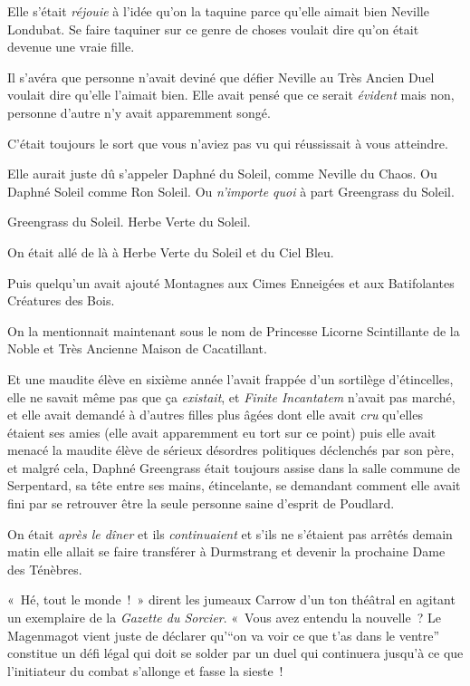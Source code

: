 Elle s'était \emph{réjouie} à l'idée qu'on la taquine parce qu'elle aimait bien Neville Londubat.
Se faire taquiner sur ce genre de choses voulait dire qu'on était devenue une vraie fille.

Il s'avéra que personne n'avait deviné que défier Neville au Très Ancien Duel voulait dire qu'elle l'aimait bien.
Elle avait pensé que ce serait \emph{évident} mais non, personne d'autre n'y avait apparemment songé.

C'était toujours le sort que vous n'aviez pas vu qui réussissait à vous atteindre.

Elle aurait juste dû s'appeler Daphné du Soleil, comme Neville du Chaos.
Ou Daphné Soleil comme Ron Soleil.
Ou \emph{n'importe quoi} à part Greengrass du Soleil.

Greengrass du Soleil.
Herbe Verte du Soleil.

On était allé de là à Herbe Verte du Soleil et du Ciel Bleu.

Puis quelqu'un avait ajouté Montagnes aux Cimes Enneigées et aux Batifolantes Créatures des Bois.

On la mentionnait maintenant sous le nom de Princesse Licorne Scintillante de la Noble et Très Ancienne Maison de Cacatillant.

Et une maudite élève en sixième année l'avait frappée d'un sortilège d'étincelles, elle ne savait même pas que ça \emph{existait}, et \emph{Finite Incantatem} n'avait pas marché, et elle avait demandé à d'autres filles plus âgées dont elle avait \emph{cru} qu'elles étaient ses amies (elle avait apparemment eu tort sur ce point) puis elle avait menacé la maudite élève de sérieux désordres politiques déclenchés par son père, et malgré cela, Daphné Greengrass était toujours assise dans la salle commune de Serpentard, sa tête entre ses mains, étincelante, se demandant comment elle avait fini par se retrouver être la seule personne saine d'esprit de Poudlard.

On était \emph{après le dîner} et ils \emph{continuaient} et s'ils ne s'étaient pas arrêtés demain matin elle allait se faire transférer à Durmstrang et devenir la prochaine Dame des Ténèbres.

«~Hé, tout le monde~!~»
dirent les jumeaux Carrow d'un ton théâtral en agitant un exemplaire de la \emph{Gazette du Sorcier}.
«~Vous avez entendu la nouvelle~?
Le Magenmagot vient juste de déclarer qu'“on va voir ce que t'as dans le ventre” constitue un défi légal qui doit se solder par un duel qui continuera jusqu'à ce que l'initiateur du combat s'allonge et fasse la sieste~!

